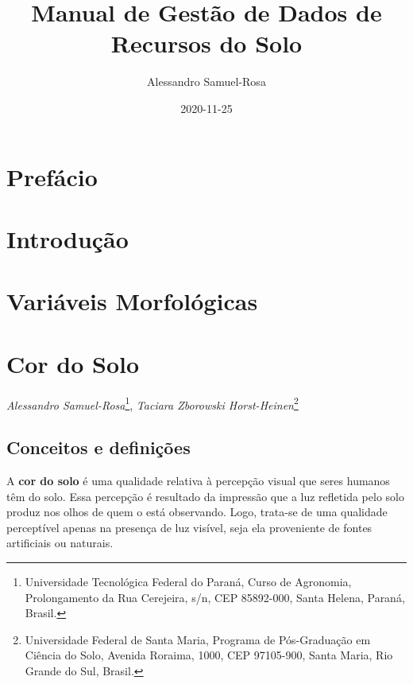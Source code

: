 \documentclass[
]{book}
\title{Manual de Gestão de Dados de Recursos do Solo}
\author{Alessandro Samuel-Rosa}
\date{2020-11-25}
\begin{document}
\maketitle

{
\setcounter{tocdepth}{1}
\tableofcontents
}
\hypertarget{prefuxe1cio}{%
\chapter*{Prefácio}\label{prefuxe1cio}}

\hypertarget{intro}{%
\chapter{Introdução}\label{intro}}

\hypertarget{variuxe1veis-morfoluxf3gicas}{%
\chapter*{Variáveis Morfológicas}\label{variuxe1veis-morfoluxf3gicas}}

\hypertarget{cor-do-solo}{%
\chapter{Cor do Solo}\label{cor-do-solo}}

\emph{Alessandro Samuel-Rosa}\footnote{Universidade Tecnológica Federal do Paraná, Curso de Agronomia, Prolongamento da Rua Cerejeira, s/n, CEP 85892-000, Santa Helena, Paraná, Brasil.}, \emph{Taciara Zborowski Horst-Heinen}\footnote{Universidade Federal de Santa Maria, Programa de Pós-Graduação em Ciência do Solo, Avenida Roraima, 1000, CEP 97105-900, Santa Maria, Rio Grande do Sul, Brasil.}

\hypertarget{conceitos-e-definiuxe7uxf5es}{%
\section{Conceitos e definições}\label{conceitos-e-definiuxe7uxf5es}}

A \textbf{cor do solo} é uma qualidade relativa à percepção visual que seres humanos têm do solo. Essa percepção é resultado da impressão que a luz refletida pelo solo produz nos olhos de quem o está observando. Logo, trata-se de uma qualidade perceptível apenas na presença de luz visível, seja ela proveniente de fontes artificiais ou naturais.
\end{document}
